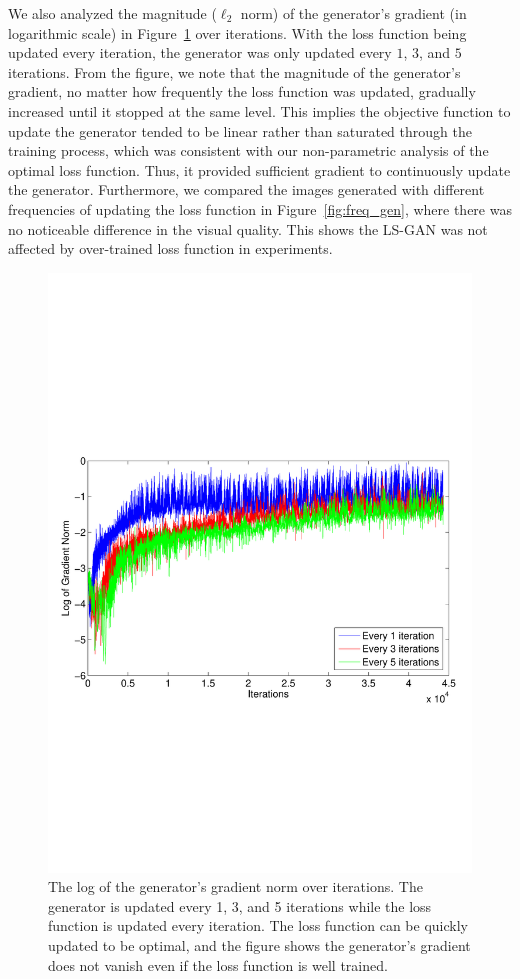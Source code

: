 We also analyzed the magnitude ($\ell_2$ norm) of the generator's gradient (in logarithmic scale) in Figure~\ref{fig:gradG} over iterations. With the loss function being updated every iteration, the generator was only updated every $1$, $3$, and $5$ iterations.
From the figure, we note that the magnitude of the generator's gradient, no matter how frequently the loss function was updated, gradually increased until it stopped at the same level. This implies the objective function to update the generator tended to be linear rather than saturated through the training process, which was consistent with our non-parametric analysis of the optimal loss function. Thus, it provided sufficient gradient to continuously update the generator. Furthermore, we compared the images generated with different frequencies of updating the loss function in Figure~\ref{fig:freq_gen}, where there was no noticeable difference in the visual quality.  This shows the LS-GAN was not affected by over-trained loss function in experiments.

\begin{figure}[t!]
    \centering
        \includegraphics[width=0.6\linewidth, trim={0cm 8cm 0cm 8cm},clip=true]{gradG.pdf}
        \caption{The log of the generator's gradient norm over iterations. The generator is updated every 1, 3, and 5 iterations while the loss function is updated every iteration.  The loss function can be quickly updated to be optimal, and the figure shows the generator's gradient does not vanish even if the loss function is well trained.}\label{fig:gradG}
\end{figure}

